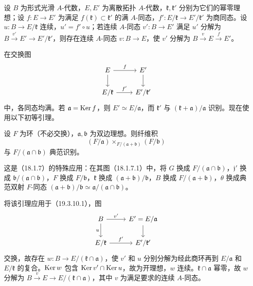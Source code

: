 设 $B$ 为形式光滑 $A$-代数，$E,E'$ 为离散拓扑 $A$-代数，$\mathfrak k,\mathfrak k'$ 分别为它们的幂零理想；设 $f:E\to E'$ 为满足 $f(\mathfrak k)\subset\mathfrak k'$ 的满 $A$-同态，$f':E/\mathfrak k\to E'/\mathfrak k'$ 为商同态。设 $u:B\to E/\mathfrak k$ 连续，$u'=f'\circ u$；若连续 $A$-同态 $v':B\to E'$ 满足 $u'$ 分解为 $B\xrightarrow{v'}E'\to E'/\mathfrak k'$，则存在连续 $A$-同态 $v:B\to E$，使 $v'$ 分解为 $B\xrightarrow{v}E\xrightarrow{f}E'$。

在交换图
\[
\begin{tikzcd}
 E\arrow[r,"f"]\arrow[d]&E'\arrow[d]\\
 E/\mathfrak k\arrow[r,"f'"]&E'/\mathfrak k'
\end{tikzcd}
\]
中，各同态均满。若 $\mathfrak a=\operatorname{Ker} f$，则 $E'\simeq E/\mathfrak a$，而 $\mathfrak k'$ 与 $(\mathfrak k+\mathfrak a)/\mathfrak a$ 识别。现在使用以下初等引理。

设 $F$ 为环（不必交换），$\mathfrak a,\mathfrak b$ 为双边理想。则纤维积
\[
 (F/\mathfrak a)\times_{F/(\mathfrak a+\mathfrak b)}(F/\mathfrak b)
\]
与 $F/(\mathfrak a\cap\mathfrak b)$ 典范识别。

这是（18.1.7）的特殊应用：在其图（18.1.7.1）中，将 $G$ 换成 $F/(\mathfrak a\cap\mathfrak b)$，$\mathfrak j'$ 换成 $\mathfrak b/(\mathfrak a\cap\mathfrak b)$，$F$ 换成 $F/\mathfrak b$，$\mathfrak k$ 换成 $(\mathfrak a+\mathfrak b)/\mathfrak b$，$B$ 换成 $F/(\mathfrak a+\mathfrak b)$，$\theta$ 换成典范双射 $F$-同态 $(\mathfrak a+\mathfrak b)/\mathfrak b\simeq\mathfrak a/(\mathfrak a\cap\mathfrak b)$。

将该引理应用于（19.3.10.1），图
\[
\begin{tikzcd}
 B\arrow[r,"v'"]\arrow[d,"u"']&E'=E/\mathfrak a\arrow[d]\\
 E/\mathfrak k\arrow[r,"f'"]&E'/\mathfrak k'
\end{tikzcd}
\]
交换，故存在 $w:B\to E/(\mathfrak k\cap\mathfrak a)$，使 $v'$ 和 $u$ 分别分解为经此商环再到 $E/\mathfrak a$ 和 $E/\mathfrak k$ 的复合。$\operatorname{Ker} w$ 包含 $\operatorname{Ker} v'\cap\operatorname{Ker} u$，故为开理想，$w$ 连续。$\mathfrak k\cap\mathfrak a$ 幂零，故 $w$ 分解为 $B\xrightarrow{v}E\to E/(\mathfrak k\cap\mathfrak a)$，其中 $v$ 为满足要求的连续 $A$-同态。

